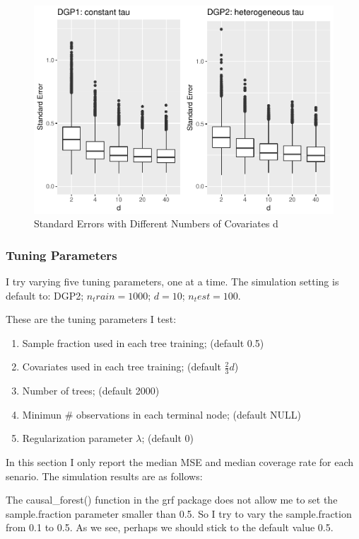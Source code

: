 \documentclass[]{article}
\providecommand{\tightlist}{%
  \setlength{\itemsep}{0pt}\setlength{\parskip}{0pt}}
\begin{document}
\begin{figure}
\centering
\includegraphics{report_files/figure-latex/fig4-1.pdf}
\caption{\label{fig:fig4}Standard Errors with Different Numbers of
Covariates d}
\end{figure}

\subsubsection{Tuning Parameters}\label{tuning-parameters}

I try varying five tuning parameters, one at a time. The simulation
setting is default to: DGP2; \(n_train=1000\); \(d=10\); \(n_test=100\).

These are the tuning parameters I test:

\begin{enumerate}
\def\labelenumi{\arabic{enumi}.}
\tightlist
\item
  Sample fraction used in each tree training; (default 0.5)
\item
  Covariates used in each tree training; (default \(\frac{2}{3}d\))
\item
  Number of trees; (default 2000)
\item
  Minimun \# observations in each terminal node; (default NULL)
\item
  Regularization parameter \(\lambda\); (default 0)
\end{enumerate}

In this section I only report the median MSE and median coverage rate
for each senario. The simulation results are as follows:

The causal\_forest() function in the grf package does not allow me to
set the sample.fraction parameter smaller than 0.5. So I try to vary the
sample.fraction from 0.1 to 0.5. As we see, perhaps we should stick to
the default value 0.5.
\end{document}
